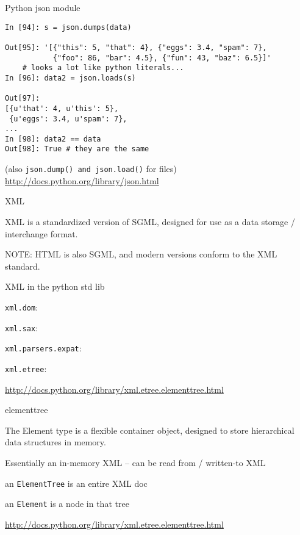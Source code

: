 \documentclass{beamer}
\begin{document}
\begin{frame}[fragile]{Python json module}

{\small
\begin{verbatim}
In [94]: s = json.dumps(data)

Out[95]: '[{"this": 5, "that": 4}, {"eggs": 3.4, "spam": 7},
           {"foo": 86, "bar": 4.5}, {"fun": 43, "baz": 6.5}]'
    # looks a lot like python literals...
In [96]: data2 = json.loads(s)

Out[97]: 
[{u'that': 4, u'this': 5},
 {u'eggs': 3.4, u'spam': 7},
...
In [98]: data2 == data
Out[98]: True # they are the same

\end{verbatim}
}
(also \verb|json.dump() and json.load()| for files)
\vfill
\url{http://docs.python.org/library/json.html}
\end{frame} 



\begin{frame}[fragile]{XML}

\vfill
{\Large XML is a standardized version of SGML, designed for use as a data
        storage / interchange format.}

\vfill
{\Large NOTE: HTML is also SGML, and modern versions conform to the XML standard.}

\end{frame} 

\begin{frame}[fragile]{XML in the python std lib}


\vfill
{\Large \verb|xml.dom|: }

\vfill
{\Large \verb|xml.sax|: }

\vfill
{\Large \verb|xml.parsers.expat|: }

\vfill
{\Large \verb|xml.etree|: }

\url{http://docs.python.org/library/xml.etree.elementtree.html}

\end{frame} 

\begin{frame}[fragile]{elementtree}


\vfill
{\Large  The Element type is a flexible container object, designed to store
hierarchical data structures in memory.}

\vfill
{\Large  Essentially an in-memory XML -- can be read from / written-to XML}

\vfill
{\Large an \verb`ElementTree` is an entire XML doc}

\vfill
{\Large an \verb`Element` is a node in that tree}

\vfill
\url{http://docs.python.org/library/xml.etree.elementtree.html}

\end{frame} 
\end{document}
